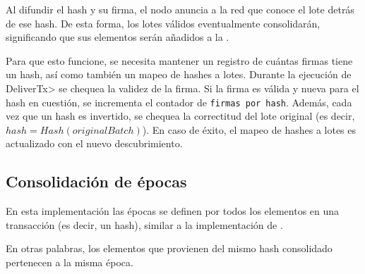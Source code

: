 %
Al difundir el hash y su firma, el nodo anuncia a la red que conoce el lote detrás de ese hash.
%
De esta forma, los lotes válidos eventualmente consolidarán, significando que sus elementos
serán añadidos a la \setchain.

Para que esto funcione, se necesita mantener un registro de cuántas firmas tiene un hash,
así como también un mapeo de hashes a lotes.
%
Durante la ejecución de \<DeliverTx> se chequea la validez de la firma.
%
Si la firma es válida y nueva para el hash en cuestión, se incrementa el contador de
\texttt{firmas por hash}.
%
Además, cada vez que un hash es invertido, se chequea la correctitud del lote original
(es decir, $hash = Hash(originalBatch)$). En caso de éxito, el mapeo de hashes a lotes
es actualizado con el nuevo descubrimiento.

%


%




\subsection{Consolidación de épocas}\label{subsubsec:consolidation}

En esta implementación las épocas se definen por todos los elementos en una transacción
(es decir, un hash), similar
a la implementación de \compresschain.

%
En otras palabras, los elementos que provienen del mismo hash consolidado pertenecen a la
misma época.

